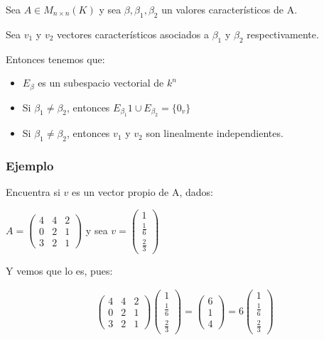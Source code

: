 \documentclass[12pt]{report}                                %
\begin{document}
        Sea $A \in M_{n \times n} (K)$ y sea $\beta ,\beta_1, \beta_2$ un valores característicos de A.

        Sea $v_1$ y $v_2$ vectores característicos asociados a $\beta_1$ y $\beta_2$ respectivamente.

        Entonces tenemos que:

        \begin{itemize}  
            \item $E_{\beta}$ es un subespacio vectorial de $k^n$
            \item Si $\beta_1 \neq \beta_2$, entonces $E_{\beta_1} 1 \cup E_{\beta_2} = \{0_v\}$
            \item Si $\beta_1 \neq \beta_2$, entonces $v_1$ y $v_2$ son linealmente independientes.
        \end{itemize}  


            \clearpage
            \subsubsection{Ejemplo}
            Encuentra si $v$ es un vector propio de A, dados:

            $A = \begin{pmatrix}4&4&2\\0&2&1\\3&2&1\end{pmatrix}$ y sea 
            $v = \begin{pmatrix}1\\\frac{1}{6}\\\frac{2}{3}\end{pmatrix}$

            Y vemos que lo es, pues:

            \begin{equation*}
            \begin{split}
                \begin{pmatrix}4&4&2\\0&2&1\\3&2&1\end{pmatrix}
                \begin{pmatrix}1\\\frac{1}{6}\\\frac{2}{3}\end{pmatrix} =
                \begin{pmatrix}6\\1\\4\end{pmatrix} =
                6\begin{pmatrix}1\\\frac{1}{6}\\\frac{2}{3}\end{pmatrix}
            \end{split}
            \end{equation*}
        
\end{document}
